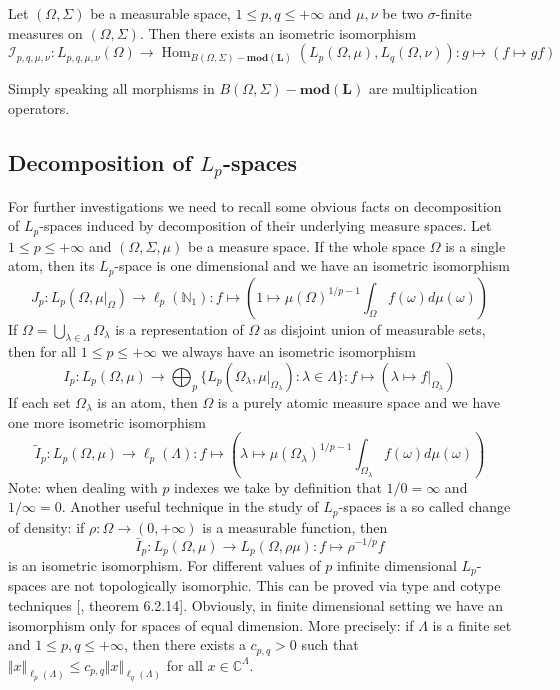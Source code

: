 \begin{theorem}\label{LpModMorphCharac}
Let $(\Omega,\Sigma)$ be a measurable space, $1\leq p,q\leq +\infty$ and $\mu,\nu$ be two $\sigma$-finite measures on $(\Omega, \Sigma)$. Then there exists an isometric isomorphism
$$
\mathcal{I}_{p,q,\mu,\nu}:L_{p,q,\mu,\nu}(\Omega)\to\operatorname{Hom}_{B(\Omega,\Sigma)-\mathbf{mod(L)}}(L_p(\Omega,\mu),L_q(\Omega,\nu)):g\mapsto (f\mapsto g f)
$$
\end{theorem}

Simply speaking all morphisms in $B(\Omega,\Sigma)-\mathbf{mod(L)}$ are multiplication operators.


\subsection{Decomposition of \texorpdfstring{$L_p$}{Lp}-spaces}
\label{SubSectionDecompositionOfLpSpaces}

For further investigations we need to recall some obvious facts on decomposition of $L_p$-spaces induced by decomposition of their underlying measure spaces. Let $1\leq p\leq+\infty$ and $(\Omega,\Sigma,\mu)$ be a measure space. If the whole space $\Omega$ is a single atom, then its $L_p$-space is one dimensional and we have an isometric isomorphism
$$
J_p:L_p(\Omega,\mu|_{\Omega})\to \ell_p(\mathbb{N}_1):f\mapsto\left(1\mapsto \mu(\Omega)^{1/p-1}\int_{\Omega} f(\omega)d\mu(\omega)\right)
$$
If $\Omega=\bigcup_{\lambda\in\Lambda}\Omega_\lambda$ is a representation of $\Omega$ as disjoint union of measurable sets, then for all $1\leq p\leq+\infty$ we always have an isometric isomorphism
$$
I_p:L_p(\Omega,\mu)\to \bigoplus\nolimits_p\{ L_p(\Omega_\lambda,\mu|_{\Omega_\lambda}):\lambda\in\Lambda\}: f\mapsto (\lambda\mapsto f|_{\Omega_\lambda})
$$
If each set $\Omega_\lambda$ is an atom, then $\Omega$ is a purely atomic measure space and we have one more isometric isomorphism
$$
\widetilde{I}_p:L_p(\Omega,\mu)\to \ell_p(\Lambda):f\mapsto\left (\lambda\mapsto \mu(\Omega_\lambda)^{1/p-1}\int_{\Omega_\lambda} f(\omega)d\mu(\omega)\right)
$$
Note: when dealing with $p$ indexes we take by definition that $1/0=\infty$ and $1/\infty=0$. Another useful technique in the study of $L_p$-spaces is a so called change of density: if $\rho:\Omega\to(0,+\infty)$ is a measurable function, then
$$
\bar{I}_p:L_p(\Omega,\mu)\to L_p(\Omega,\rho\mu): f\mapsto\rho^{-1/p} f
$$
is an isometric isomorphism. For different values of $p$ infinite dimensional $L_p$-spaces are not topologically isomorphic. This can be proved via type and cotype techniques [\cite{KalAlbTopicsBanSpTh}, theorem 6.2.14]. Obviously, in finite dimensional setting we have an isomorphism only for spaces of equal dimension. More precisely: if $\Lambda$ is a finite set and $1\leq p,q\leq +\infty$, then there exists a $c_{p,q}>0$ such that $\Vert x\Vert_{\ell_p(\Lambda)}\leq c_{p,q}\Vert x\Vert_{\ell_q(\Lambda)}$ for all $x\in\mathbb{C}^\Lambda$.


